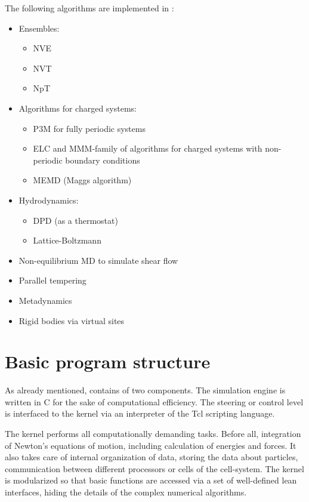 The following algorithms are implemented in \es{}:

\begin{itemize}
\item Ensembles: 
  \begin{itemize} 
  \item NVE
  \item NVT
  \item NpT
  \end{itemize}
\item Algorithms for charged systems:
  \begin{itemize}
  \item P3M for fully periodic systems
  \item ELC and MMM-family of algorithms for charged systems with
    non-periodic boundary conditions
  \item MEMD (Maggs algorithm)
  \end{itemize}
\item Hydrodynamics:
  \begin{itemize}
  \item DPD (as a thermostat)
  \item Lattice-Boltzmann
  \end{itemize}
\item Non-equilibrium MD to simulate shear flow
\item Parallel tempering
\item Metadynamics
\item Rigid bodies via virtual sites
\end{itemize}

\section{Basic program structure}
\label{sec:structure}

As already mentioned, \es contains of two components.
The simulation engine is written in C for the sake
of computational efficiency. The steering or control
level is interfaced to the kernel via an interpreter 
of the Tcl scripting language.

The kernel performs all computationally demanding tasks. Before all,
integration of Newton's equations of motion, including calculation
of energies and forces. It also takes care of internal organization 
of data, storing the data about particles, communication between 
different processors or cells of the cell-system. The kernel is modularized
so that basic functions are accessed via a set of well-defined
lean interfaces, hiding the details of the complex numerical
algorithms.

